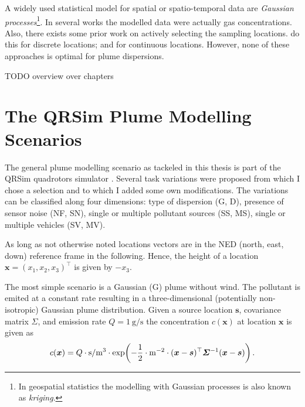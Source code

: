 \documentclass[11pt,a4paper]{scrreprt}
\newcommand{\vc}[1]{\bm{#1}}
\newcommand{\mat}[1]{\bm{#1}}
\newcommand{\T}{^{\top}}
\newcommand{\newterm}[1]{\emph{#1}}
\begin{document}
A widely used statistical model for spatial or spatio-temporal data are 
\newterm{Gaussian processes}\footnote{In geospatial statistics the modelling 
    with Gaussian processes is also known as \newterm{kriging}.}. In several 
works \parencite[e.g.][]{Stachniss:2008vz, Marchant:2012wb} the modelled data 
were actually gas concentrations. Also, there exists some prior work on actively 
selecting the sampling locations. \Textcite{Stranders:2008wl} do this for 
discrete locations; \textcite{Singh:2010wt} and \textcite{Marchant:2012wb} for 
continuous locations. However, none of these approaches is optimal for plume 
dispersions.

TODO overview over chapters

\chapter{The QRSim Plume Modelling Scenarios}
The general plume modelling scenario as tackeled in this thesis is part of the 
QRSim quadrotors simulator \parencite{denardi2013rn}. Several task variations 
were proposed from which I chose a selection and to which I added some own 
modifications.  The variations can be classified along four dimensions: type of 
dispersion (G, D), presence of sensor noise (NF, SN), single or multiple 
pollutant sources (SS, MS), single or multiple vehicles (SV, MV).

As long as not otherwise noted locations vectors are in the NED (north, east, 
down) reference frame in the following. Hence, the height of a location $\vc 
x = (x_1, x_2, x_3)\T$ is given by $-x_3$.

The most simple scenario is a Gaussian (G) plume without wind. The pollutant is 
emited at a constant rate resulting in a three-dimensional (potentially 
non-isotropic) Gaussian plume distribution. Given a source location $\vc s$, 
covariance matrix $\mat \varSigma$, and emission rate $Q 
= \SI{1}{\gram\per\second}$ the concentration $c(\vc x)$ at location $\vc x$ is 
given as
\begin{equation}
    c(\vc x) = Q \cdot \si{\second\per\meter^3} \cdot \exp\!\del{-\frac{1}{2} 
        \cdot \si{\meter^{-2}} \cdot (\vc x - \vc s)\T \mat \varSigma^{-1} (\vc 
        x - \vc s)}.
\end{equation}
\end{document}
